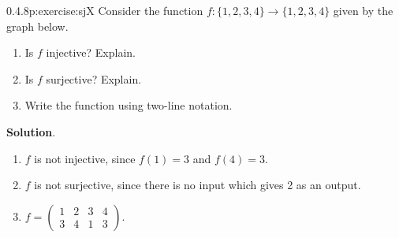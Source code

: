 \documentclass[twoside,11pt,]{book}
\newcommand{\blocktitlefont}{\relax}
\numberwithin{equation}{chapter}
\newcommand{\amp}{&}
\begin{document}
\begin{divisionsolution}{0.4.8}{}{p:exercise:sjX}%
Consider the function \(f:\{1,2,3,4\} \to \{1,2,3,4\}\) given by the graph below.%
\begin{sidebyside}{1}{0.3}{0.3}{0}%
\begin{sbspanel}{0.4}%
%
\end{sbspanel}%
\end{sidebyside}%
\par
%
\begin{enumerate}[label=(\alph*)]
\item{}Is \(f\) injective? Explain.%
\item{}Is \(f\) surjective? Explain.%
\item{}Write the function using two-line notation.%
\end{enumerate}
%
\par\smallskip%
\noindent\textbf{\blocktitlefont Solution}.\quad{}%
\begin{enumerate}[label=(\alph*)]
\item{}\(f\) is not injective, since \(f(1) = 3\) and \(f(4) = 3\).%
\item{}\(f\) is not surjective, since there is no input which gives 2 as an output.%
\item{}\(f=\begin{pmatrix} 1 \amp 2 \amp 3 \amp 4 \\ 3 \amp 4 \amp 1 \amp 3\end{pmatrix}\).%
\end{enumerate}
%
\end{divisionsolution}%
\end{document}
